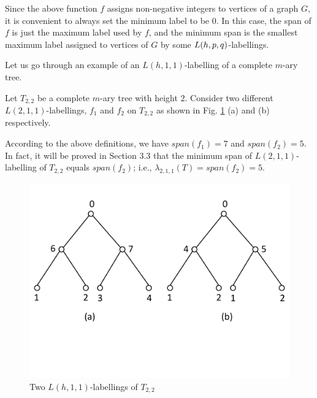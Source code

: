 \begin{remark}
\label{0}
Since the above function $f$ assigns non-negative integers to vertices of a graph $G$, it is convenient to always set the minimum label to be $0$. In this case, the span of $f$ is just the maximum label used by $f$, and the minimum span is the smallest maximum label assigned to vertices of $G$ by some $L(h,p,q)$-labellings. 
\end{remark}

Let us go through an example of an $L(h,1,1)$-labelling of a complete $m$-ary tree. 

\begin{example}
Let $T_{2,2}$ be a complete $m$-ary tree with height $2$. Consider two different $L(2,1,1)$-labellings,  $f_1$ and $f_2$ on $T_{2,2}$ as shown in Fig. \ref{linear metric labelling} (a) and (b) respectively.

According to the above definitions, we have $span(f_1) = 7$ and $span(f_2) = 5$. In fact, it will be proved in Section 3.3 that the minimum span of $L(2,1,1)$-labelling of $T_{2,2}$ equals $span(f_2)$; i.e., $\lambda_{2,1,1}(T) = span(f_2) = 5$. 
  

\begin{figure}
\centering
      \vspace{-10pt}
    \includegraphics[scale=0.4]{../figures/fig3-1.pdf}
        \vspace{-50pt}
\caption{Two $L(h,1,1)$-labellings of $T_{2,2}$}
\label{linear metric labelling}
\end{figure}

\end{example}




